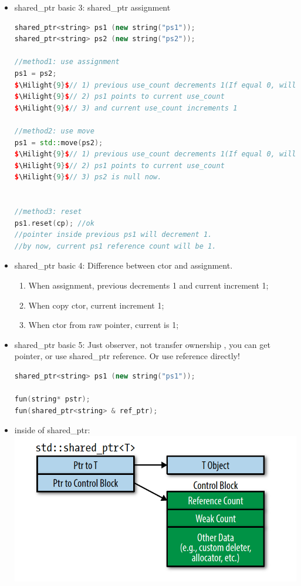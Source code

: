 \documentclass[a4paper,12pt,twoside]{book}
\newcommand{\Hilight}[1]{\makebox[0pt][l]{\color{yellow}\rule[-3pt]{#1em}{11pt}}}
\begin{document}
\begin{itemize}
\item shared\_ptr basic 3: shared\_ptr assignment
\begin{lstlisting}[frame=single, language=c++, mathescape=true]
shared_ptr<string> ps1 (new string("ps1"));
shared_ptr<string> ps2 (new string("ps2"));

//method1: use assignment
ps1 = ps2;
$\Hilight{9}$// 1) previous use_count decrements 1(If equal 0, will delete)
$\Hilight{9}$// 2) ps1 points to current use_count
$\Hilight{9}$// 3) and current use_count increments 1

//method2: use move
ps1 = std::move(ps2);
$\Hilight{9}$// 1) previous use_count decrements 1(If equal 0, will delete)
$\Hilight{9}$// 2) ps1 points to current use_count
$\Hilight{9}$// 3) ps2 is null now. 


//method3: reset
ps1.reset(cp); //ok
//pointer inside previous ps1 will decrement 1.
//by now, current ps1 reference count will be 1.
\end{lstlisting}

\item shared\_ptr basic 4: Difference between ctor and assignment.
\begin{enumerate}
\item When assignment, previous decrements 1 and current increment 1;
\item When copy ctor, current increment 1;
\item When ctor from raw pointer, current is 1;
\end{enumerate}

\item shared\_ptr basic 5: Just observer, not transfer ownership , you can get pointer, or use shared\_ptr reference. Or use reference directly!
\begin{lstlisting}[frame=single, language=c++]
shared_ptr<string> ps1 (new string("ps1"));

fun(string* pstr);
fun(shared_ptr<string> & ref_ptr);
\end{lstlisting}

\item inside of shared\_ptr: \newline
\includegraphics[scale=0.8]{pics/shared.png}


\end{itemize}
\end{document}
